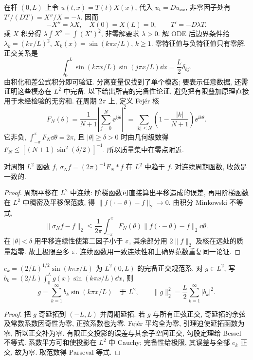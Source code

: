 \label{ch:series}
在杆 $(0,L)$ 上令 $u(t,x)=T(t)X(x)$, 代入 $u_t=Du_{xx}$, 非零因子处有 $T'/(DT)=X''/X=-\lambda$. 因而
\[
-X''=\lambda X,\quad X(0)=X(L)=0,\qquad T'= -D\lambda T.
\]
乘 $X$ 积分得 $\lambda\int X^2=\int (X')^2$, 非零解要求 $\lambda>0$. 解 ODE 后边界条件给 $\lambda_k=(k\pi/L)^2$, $X_k(x)=\sin(k\pi x/L)$, $k\ge1$. 零特征值与负特征值只有零解. 正交关系是
\[
\int_0^L\sin(k\pi x/L)\sin(j\pi x/L)\dd x=\frac L2\delta_{kj}.
\]
由积化和差公式积分即可验证. 分离变量仅找到了单个模态; 要表示任意数据, 还需证明这些模态在 $L^2$ 中完备.
以下给出所需的完备性论证, 避免把有限叠加原理直接用于未经检验的无穷和. 在周期 $2\pi$ 上, 定义 Fejér 核
\[
F_N(\theta)=\frac1{N+1}\left|\sum_{j=0}^N\ee^{\ii j\theta}\right|^2
=\sum_{|k|\le N}\left(1-\frac{|k|}{N+1}\right)\ee^{\ii k\theta}.
\]
它非负, $\int_{-\pi}^{\pi}F_N\dd\theta=2\pi$, 且 $|\theta|\ge\delta>0$ 时由几何级数得 $F_N\le[(N+1)\sin^2(\delta/2)]^{-1}$. 所以质量集中在零点附近.
\begin{lemma}\label{lem:fejer}
对周期 $L^2$ 函数 $f$, $\sigma_N f=(2\pi)^{-1}F_N*f$ 在 $L^2$ 中趋于 $f$. 对连续周期函数, 收敛是一致的.
\end{lemma}
\begin{proof}
周期平移在 $L^2$ 中连续: 阶梯函数可直接算出平移造成的误差, 再用阶梯函数在 $L^2$ 中稠密及平移保范数, 得 $\|f(\cdot-\theta)-f\|_2\to0$. 由积分 Minkowski 不等式,
\[
\|\sigma_N f-f\|_2\le\frac1{2\pi}\int_{-\pi}^{\pi}F_N(\theta)\|f(\cdot-\theta)-f\|_2\dd\theta.
\]
在 $|\theta|<\delta$ 用平移连续性使第二因子小于 $\varepsilon$, 其余部分用 $2\|f\|_2$ 及核在远处的质量趋零. 故上极限至多 $\varepsilon$. 连续函数用一致连续性和上确界范数重复同一论证.
\end{proof}
\begin{theorem}\label{thm:sinebasis}
$e_k=(2/L)^{1/2}\sin(k\pi x/L)$ 为 $L^2(0,L)$ 的完备正交规范系. 对 $g\in L^2$, 写 $b_k=(2/L)\int_0^Lg(x)\sin(k\pi x/L)\dd x$, 则
\[
g=\sum_{k=1}^\infty b_k\sin(k\pi x/L)\quad\text{于 }L^2,
\qquad \|g\|_2^2=\frac L2\sum_{k=1}^\infty |b_k|^2.
\]
\end{theorem}
\begin{proof}
把 $g$ 奇延拓到 $(-L,L)$ 并周期延拓. 若 $g$ 与所有正弦正交, 奇延拓的余弦及常数系数因奇性为零, 正弦系数也为零. Fejér 平均全为零, 引理迫使延拓函数为零, 所以正交补为零. 有限正交投影的误差与其余子空间正交, 勾股定理给 Bessel 不等式. 系数平方可和使投影在 $L^2$ 中 Cauchy; 完备性给极限, 其误差与全部 $e_k$ 正交, 故为零. 取范数得 Parseval 等式.
\end{proof}
